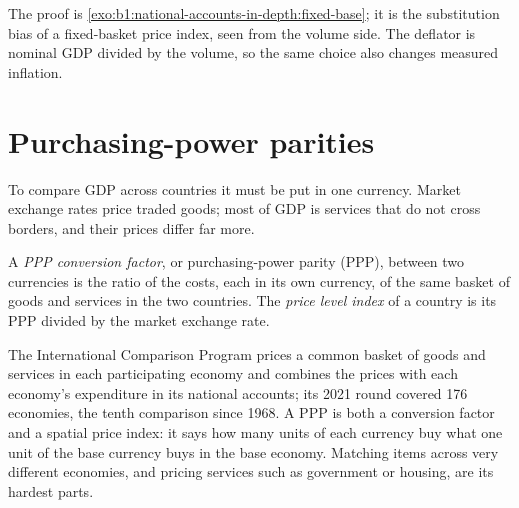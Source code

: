 The proof is \cref{exo:b1:national-accounts-in-depth:fixed-base}; it is the
substitution bias of a fixed-basket price index, seen from the volume side.
The deflator is nominal GDP divided by the volume, so the same choice also
changes measured inflation.

\section{Purchasing-power parities}\label{sec:b1:national-accounts-in-depth:ppp}

To compare GDP across countries it must be put in one currency. Market
exchange rates price traded goods; most of GDP is services that do not
cross borders, and their prices differ far more.

\begin{definition}\label{def:b1:national-accounts-in-depth:ppp}
A \emph{PPP conversion factor}, or purchasing-power parity (PPP), between two
currencies is the ratio of the costs, each in its own currency, of the
same basket of goods and services in the two countries. The \emph{price level
index} of a country is its PPP divided by the market exchange rate.
\end{definition}

\begin{measure}
The International Comparison Program prices a common basket of goods and
services in each participating economy and combines the prices with each
economy's expenditure in its national accounts; its 2021 round covered 176
economies, the tenth comparison since 1968. %
A PPP is both a conversion factor and a spatial price index: it says how
many units of each currency buy what one unit of the base currency buys
in the base economy. Matching items across very different economies, and
pricing services such as government or housing, are its hardest parts.
\end{measure}

